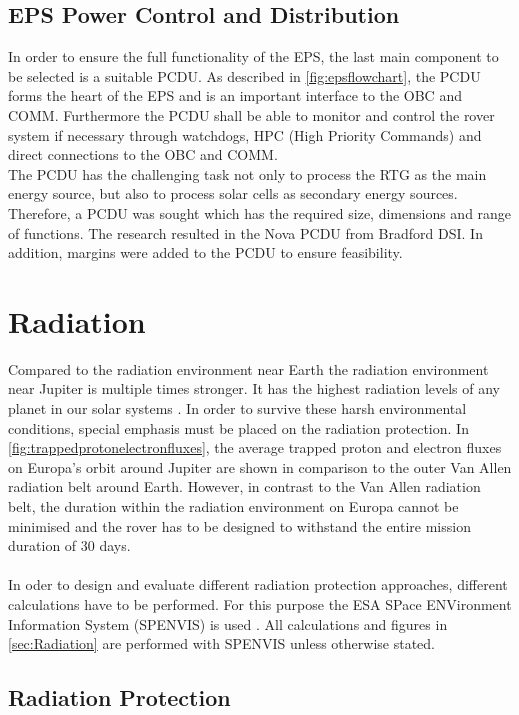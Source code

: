 \subsection{EPS Power Control and Distribution}
In order to ensure the full functionality of the EPS, the last main component to be selected is a suitable PCDU. As described in \autoref{fig:epsflowchart}, the PCDU forms the heart of the EPS and is an important interface to the OBC and COMM. Furthermore the PCDU shall be able to monitor and control the rover system if necessary through watchdogs, HPC (High Priority Commands) and direct connections to the OBC and COMM.\\
The PCDU has the challenging task not only to process the RTG as the main energy source, but also to process solar cells as secondary energy sources. Therefore, a PCDU was sought which has the required size, dimensions and range of functions. The research resulted in the Nova PCDU from Bradford DSI. In addition, margins were added to the PCDU to ensure feasibility.

\clearpage

\section{Radiation}
\label{sec:Radiation}

Compared to the radiation environment near Earth the radiation environment near Jupiter is multiple times stronger. It has the highest radiation levels of any planet in our solar systems \cite{Platzhalter}. In order to survive these harsh environmental conditions, special emphasis must be placed on the radiation protection. In \autoref{fig:trappedprotonelectronfluxes}, the average trapped proton and electron fluxes on Europa's orbit around Jupiter are shown in comparison to the outer Van Allen radiation belt around Earth. However, in contrast to the Van Allen radiation belt, the duration within the radiation environment on Europa cannot be minimised and the rover has to be designed to withstand the entire mission duration of 30 days. \\ \\
In oder to design and evaluate different radiation protection approaches, different calculations have to be performed. For this purpose the ESA SPace ENVironment Information System (SPENVIS) is used \cite{Platzhalter}. All calculations and figures in \autoref{sec:Radiation} are performed with SPENVIS unless otherwise stated.

\subsection{Radiation Protection}

